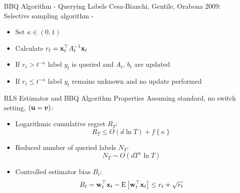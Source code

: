 \documentclass{beamer}
\begin{document}
\begin{frame}{BBQ Algorithm - Querying Labels}
Cesa-Bianchi, Gentile, Orabona 2009:
\newline\newline
Selective sampling algorithm -\newline
\begin{itemize}
\item Set $\kappa\in\left(0,1\right)$\newline
\item Calculate $r_t={\mathbf{x}}^{\top}_{t}A_{t}^{-1}\mathbf{x}_{t}$\newline
\item  If $r_t> t^{-\kappa}$ label $y_t$ is queried and $A_t$, $b_t$ are updated\newline
\item If $r_t\leq t^{-\kappa}$  label $y_t$ remains unknown and no update performed
\end{itemize}
\end{frame}

\begin{frame}{RLS Estimator and  BBQ Algorithm Properties}
Assuming standard, no switch setting, $\left(\mathbf{u}={\boldsymbol{v}}\right)$:\newline
\begin{itemize}
\item Logarithmic cumulative regret $R_T$:
\begin{equation*}
 R_T\leq O\left(d\ln{T}\right)+f\left\{\kappa\right\}
\end{equation*}
\item Reduced number of queried labels $N_T$:
\begin{equation*}
N_T\sim O\left(dT^{\kappa}\ln{T}\right)
\end{equation*}
\item Controlled estimator bias $B_t$:
\begin{equation*}
B_t={\mathbf{w}}^{\top}_{t}\mathbf{x}_{t}-{\rm E}\left[{{\mathbf{w}}^{\top}_{t}\mathbf{x}_{t}}\right]\leq r_t+\sqrt{r_t}
\end{equation*}
\end{itemize} 
\end{frame}
\end{document}
